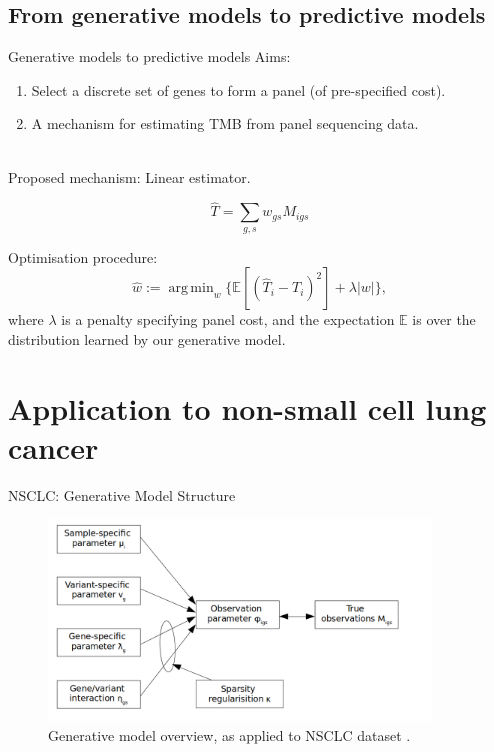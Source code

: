 \documentclass{beamer}
\DeclareMathOperator*{\argmin}{arg\,min}
\begin{document}
\subsection{From generative models to predictive models}
\begin{frame}{Generative models to predictive models}
Aims: 

\begin{enumerate}[1]
\item Select a discrete set of genes to form a panel (of pre-specified cost). 
\item A mechanism for estimating TMB from panel sequencing data.
\end{enumerate} 
~\\
Proposed mechanism: Linear estimator.

\begin{equation}
    \hat{T} = \sum_{g,s} w_{gs} M_{igs}
\end{equation}

Optimisation procedure:
\begin{equation}
    \hat{w} := \argmin_w \{ \mathbb{E}[(\hat{T}_i - T_i)^2] + \lambda |w|\},
\end{equation}
where $\lambda$ is a penalty specifying panel cost, and the expectation $\mathbb{E}$ is over the distribution learned by our generative model.
\end{frame}



\section{Application to non-small cell lung cancer}

\begin{frame}{NSCLC: Generative Model Structure}
\begin{figure}[htbp]
\centering
\includegraphics[width=4in]{figures/gen_model_overview.png}
\caption{Generative model overview, as applied to NSCLC dataset \citep{bradley_immune_2021}. \label{fig:3}}
\end{figure}
\end{frame}
\end{document}
